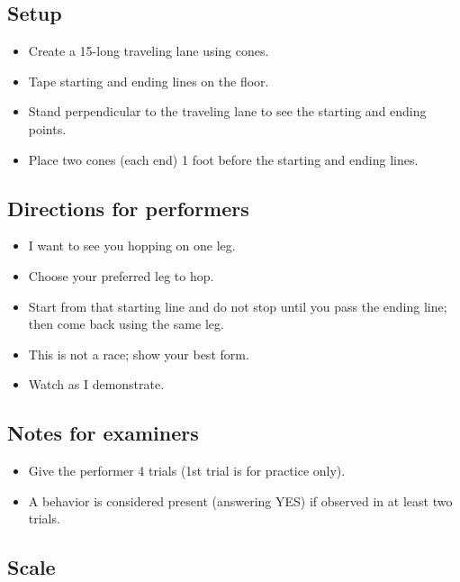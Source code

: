 \documentclass[
  letterpaper,
  DIV=11,
  numbers=noendperiod]{scrreprt}
\providecommand{\tightlist}{%
  \setlength{\itemsep}{0pt}\setlength{\parskip}{0pt}}
\begin{document}
\subsection{Setup}\label{setup-5}

\begin{itemize}
\tightlist
\item
  Create a 15-long traveling lane using cones.
\item
  Tape starting and ending lines on the floor.
\item
  Stand perpendicular to the traveling lane to see the starting and
  ending points.
\item
  Place two cones (each end) 1 foot before the starting and ending
  lines.
\end{itemize}

\subsection{Directions for
performers}\label{directions-for-performers-5}

\begin{itemize}
\tightlist
\item
  I want to see you hopping on one leg.
\item
  Choose your preferred leg to hop.
\item
  Start from that starting line and do not stop until you pass the
  ending line; then come back using the same leg.
\item
  This is not a race; show your best form.
\item
  Watch as I demonstrate.
\end{itemize}

\subsection{Notes for examiners}\label{notes-for-examiners-5}

\begin{itemize}
\tightlist
\item
  Give the performer 4 trials (1st trial is for practice only).
\item
  A behavior is considered present (answering YES) if observed in at
  least two trials.
\end{itemize}

\subsection{Scale}\label{scale-5}
\end{document}
